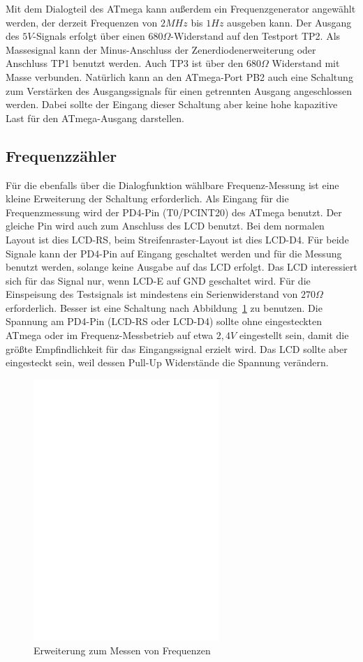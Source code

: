 Mit dem Dialogteil des ATmega kann außerdem ein Frequenzgenerator angewählt werden, der derzeit
Frequenzen von \(2MHz\) bis \(1Hz\) ausgeben kann. Der Ausgang des \(5V\)-Signals erfolgt über
einen \(680\Omega\)-Widerstand auf den Testport TP2. Als Massesignal kann der Minus-Anschluss
der Zenerdiodenerweiterung oder Anschluss TP1 benutzt werden.
Auch TP3 ist über den \(680\Omega\) Widerstand mit Masse verbunden.
Natürlich kann an den ATmega-Port PB2 auch eine Schaltung zum Verstärken des Ausgangssignals 
für einen getrennten Ausgang angeschlossen werden. Dabei sollte der Eingang dieser Schaltung
aber keine hohe kapazitive Last für den ATmega-Ausgang darstellen.

\subsection{Frequenzzähler}
\label{sec:frequency_counter}

Für die ebenfalls über die Dialogfunktion wählbare Frequenz-Messung ist eine kleine Erweiterung
der Schaltung erforderlich. Als Eingang für die Frequenzmessung wird der PD4-Pin (T0/PCINT20) des
ATmega benutzt. Der gleiche Pin wird auch zum Anschluss des LCD benutzt. Bei dem normalen Layout
ist dies LCD-RS, beim Streifenraster-Layout ist dies LCD-D4. Für beide Signale kann der PD4-Pin
auf Eingang geschaltet werden und für die Messung benutzt werden, solange keine Ausgabe auf das
LCD erfolgt. Das LCD interessiert sich für das Signal nur, wenn LCD-E auf GND geschaltet wird.
Für die Einspeisung des Testsignals ist mindestens ein Serienwiderstand von \(270\Omega\) erforderlich.
Besser ist eine Schaltung nach Abbildung~\ref{fig:FreqMes} zu benutzen. Die Spannung am PD4-Pin (LCD-RS oder
LCD-D4) sollte ohne eingesteckten ATmega oder im Frequenz-Messbetrieb auf etwa \(2,4V\) eingestellt sein,
damit die größte Empfindlichkeit für das Eingangssignal erzielt wird. Das LCD sollte aber eingesteckt sein,
weil dessen Pull-Up Widerstände die Spannung verändern.

\begin{figure}[H]
\centering
\includegraphics[width=7cm]{../FIG/Frequency_addon.eps}
\caption{Erweiterung zum Messen von Frequenzen}
\label{fig:FreqMes}
\end{figure}

